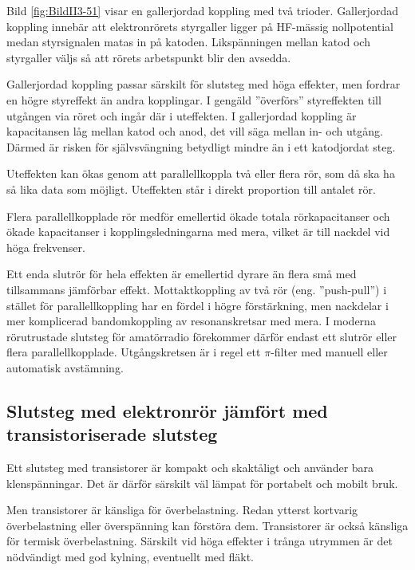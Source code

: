 
Bild \ref{fig:BildII3-51} visar en gallerjordad koppling med två trioder.
Gallerjordad koppling innebär att elektronrörets styrgaller ligger på
HF-mässig nollpotential medan styrsignalen matas in på katoden.
Likspänningen mellan katod och styrgaller väljs så att rörets arbetspunkt blir
den avsedda.

Gallerjordad koppling passar särskilt för slutsteg med höga effekter,
men fordrar en högre styreffekt än andra kopplingar.
I gengäld ''överförs'' styreffekten till utgången via röret och ingår där i
uteffekten.
I gallerjordad koppling är kapacitansen låg mellan katod och anod, det vill
säga mellan in- och utgång.
Därmed är risken för självsvängning betydligt mindre än i ett katodjordat steg.

Uteffekten kan ökas genom att parallellkoppla två eller flera rör, som då ska
ha så lika data som möjligt.
Uteffekten står i direkt proportion till antalet rör.

Flera parallellkopplade rör medför emellertid ökade totala rörkapacitanser och 
ökade kapacitanser i kopplingsledningarna med mera, vilket är till nackdel vid
höga frekvenser.

Ett enda slutrör för hela effekten är emellertid dyrare än flera små med
tillsammans jämförbar effekt.
Mottaktkoppling av två rör (eng. ''push-pull'') i stället för parallellkoppling
har en fördel i högre förstärkning, men nackdelar i mer komplicerad
bandomkoppling av resonanskretsar med mera.
I moderna rörutrustade slutsteg för amatörradio förekommer därför endast ett
slutrör eller flera parallellkopplade.
Utgångskretsen är i regel ett \(\pi \)-filter med manuell eller automatisk
avstämning.

\subsection{Slutsteg med elektronrör jämfört med transistoriserade slutsteg}

Ett slutsteg med transistorer är kompakt och skaktåligt och använder
bara klenspänningar.
Det är därför särskilt väl lämpat för portabelt och mobilt bruk.

Men transistorer är känsliga för överbelastning.
Redan ytterst kortvarig överbelastning eller överspänning kan förstöra dem.
Transistorer är också känsliga för termisk överbelastning.
Särskilt vid höga effekter i trånga utrymmen är det nödvändigt med god kylning,
eventuellt med fläkt.

